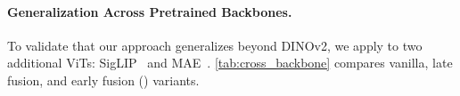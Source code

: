 







\paragraph{Generalization Across Pretrained Backbones.}
\label{subsec:cross_backbone}



To validate that our approach generalizes beyond DINOv2, we apply \model{} to two additional ViTs: SigLIP~\cite{zhai2023_siglip}
and MAE~\cite{he2022mae}.
\cref{tab:cross_backbone} compares vanilla, late fusion, and early fusion (\model{}) variants. %

